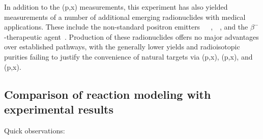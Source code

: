 


In addition to the (p,x) measurements, this experiment has also yielded measurements of  a number of additional  emerging radionuclides with medical applications.
These include the non-standard positron emitters 
\,\cite{Muller2013,Filosofov2010,Qaim2011}
\,\cite{Thisgaard2011,Zaman1996,Hermanne2000a}
\,\cite{PMID:7632762,zweit1996medium,Graves2016,Rosch2014}, 
\,\cite{Szelecsenyi2005a,Fukumura2004}
\,\cite{Lewis2003,Bandari2014,mp500671j,Szelecsenyi1993,Aslam2009,Hilgers2003,Szelecsenyi2005,Voyles2017},
and the $\beta^-$-therapeutic agent 
\,\cite{Muller2014,Deilami-nezhad2016}.
Production of these radionuclides offers no major advantages over established pathways, with the generally lower yields and radioisotopic purities failing to justify the convenience of natural targets  via   (p,x), (p,x), and  (p,x). 




\subsection{Comparison of reaction modeling with experimental results}


Quick observations:

